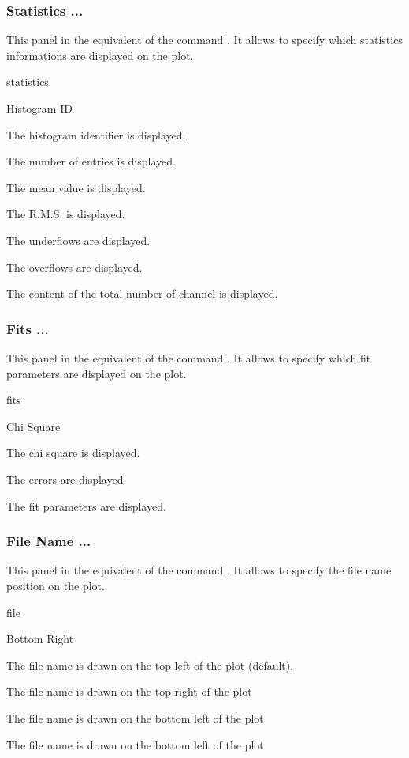 \subsubsection{Statistics ...}
This panel in the equivalent of the \XPAW{} command . It
allows to specify which statistics informations  are displayed on the plot.

\begin{PAWf}{statistics}
\begin{DLsf}{Histogram ID}
\item[Histogram ID] The histogram identifier is displayed.
\item[Entries]      The number of entries is displayed.
\item[Mean value]   The mean value is displayed.
\item[R.M.S.]       The R.M.S. is displayed.
\item[Underflows]   The underflows are displayed.
\item[Overflows]    The overflows are displayed.
\item[All channels] The content of the total number of channel is displayed.
\end{DLsf}
\end{PAWf}


\subsubsection{Fits ...}
This panel in the equivalent of the \XPAW{} command . It
allows to specify which fit parameters are displayed on the plot.

\begin{PAWf}{fits}
\begin{DLsf}{Chi Square}
\item[Chi Square]  The chi square is displayed.
\item[Errors]      The errors are displayed.
\item[Parameters]  The fit parameters are displayed.
\end{DLsf}
\end{PAWf}

\subsubsection{File Name ...}
This panel in the equivalent of the \XPAW{} command . It
allows to specify the file name position on the plot.

\begin{PAWf}{file}
\begin{DLsf}{Bottom Right}
\item[Top Left]     The file name is drawn on the top left of the plot
                    (default).
\item[Top Right]    The file name is drawn on the top right of the plot
\item[Bottom Left]  The file name is drawn on the bottom left of the plot
\item[Bottom Right] The file name is drawn on the bottom left of the plot
\end{DLsf}
\end{PAWf}


